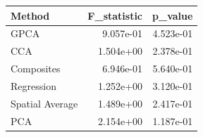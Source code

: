 \begin{tabular}{lrr}
\toprule
Method & F_statistic & p_value \\
\midrule
GPCA & 9.057e-01 & 4.523e-01 \\
CCA & 1.504e+00 & 2.378e-01 \\
Composites & 6.946e-01 & 5.640e-01 \\
Regression & 1.252e+00 & 3.120e-01 \\
Spatial Average & 1.489e+00 & 2.417e-01 \\
PCA & 2.154e+00 & 1.187e-01 \\
\bottomrule
\end{tabular}
